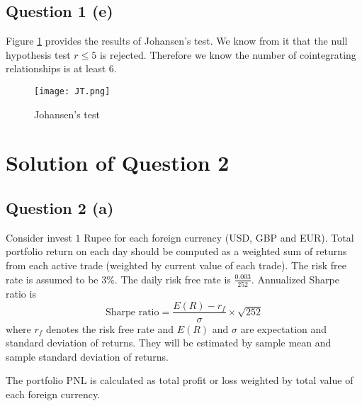 \documentclass[11pt]{article}
\begin{document}
\subsection{Question 1 (e)}

Figure \ref{JT} provides the results of Johansen's test. We know from it that the null hypothesis test $r\leq 5$ is rejected. Therefore we know the number of cointegrating relationships is at least 6.
\begin{figure}
\centering
\texttt{[image: JT.png]}
\caption{ Johansen's test}
\label{JT}
\end{figure}

\section{Solution of Question 2}
\subsection{Question 2 (a)}
Consider invest $1$ Rupee for each foreign currency (USD, GBP and EUR). Total portfolio return on each day should be computed as a weighted sum of returns from each active trade (weighted by current value of each trade). The risk free rate is assumed to be $3\%$. The daily risk free rate is $\frac{0.003}{252}$. Annualized Sharpe ratio is 
\[
\text{Sharpe ratio}=\frac{E(R)-r_f}{\sigma}\times \sqrt{252}
\]
where $r_f$ denotes the risk free rate and $E(R)$ and $\sigma$ are expectation and standard deviation of returns. They will be estimated by sample mean and sample standard deviation of returns. 

The portfolio PNL is calculated as total profit or loss weighted by total value of each foreign currency.
\end{document}

